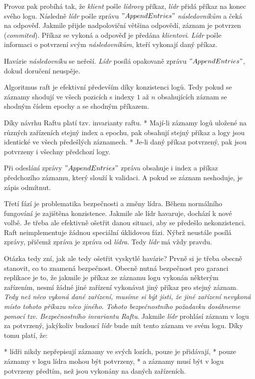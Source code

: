 Provoz pak probíhá tak, že {\em klient} pošle {\em lídrovy} příkaz, {\em lídr} přidá příkaz na konec svého logu. Následně {\em lídr} pošle zprávu $"AppendEntries"$ {\em následovníkům} a čeká na odpověď. Jakmile přijde nadpoloviční většina odpovědí, záznam je potvrzen ({\em commited}). Příkaz se vykoná a odpověď je předána {\em klientovi}. {\em Lídr} pošle informaci o potvrzení svým {\em následovníkům}, kteří vykonají daný příkaz.

Havárie {\em následovníku} se neřeší. {\em Lídr} posílá opakovaně zprávu $"AppendEntries"$, dokud doručení neuspěje.

Algoritmus raft je efektivní především díky konzistenci logů. Tedy pokud se záznamy shodují ve všech pozicích s indexy $1$ až $n$ obsahujících záznam se shodným číslem epochy a se shodným příkazem.

Díky návrhu Raftu platí tzv. {\sbf invarianty raftu}.
\begitems
* Mají-li záznamy logů uložené na různých zařízeních stejný index a epochu, pak obsahují stejný příkaz a logy jsou identické ve všech předešlých záznamech.
* Je-li daný příkaz potvrzený, pak jsou potvrzeny i všechny předchozí logy.
\enditems

Při odeslání zprávy $"AppendEntries"$ zpráva obsahuje i index a příkaz předchozího záznamu, který slouží k validaci. A pokud se záznam neshoduje, je zápis odmítnut.

{\sbf Třetí fází je problematika bezpečnosti a změny lídra}. Během normálního fungování je zajištěna konzistence. Jakmile ale lídr havaruje, dochází k nové volbě. Je třeba ale efektivně ošetřit danou situaci, aby se předešlo nekonzistenci. Raft neimplementuje žádnou speciální úklidovou fázi. Nýbrž neustále posílá zprávy, přičemž zpráva je zpráva od {\em lídra}. Tedy {\em lídr} má vždy pravdu.

Otázka tedy zní, jak ale tedy ošetřit vyskytlé havárie? Prvně si je třeba obecně stanovit, co to znamená {\sbf bezpečnost}. Obecně nutná bezpečnost pro garanci replikace je to, že jakmile je příkaz ze záznamu logu vykonán některým zařízením, nesmí žádné jiné zařízení vykonávat jiný příkaz pro stejný záznam. {\em Tedy než něco vykoná dané zařízení, musíme si být jisti, že jiné zařízení nevykoná místo tohoto příkazu něco jiného. Tohoto bezpečnostního požadavku dosáhneme pomocí tzv. {\sbf Bezpečnostního invariantu Raftu}}. Jakmile {\em lídr} prohlásí záznam v logu za potvrzený, jakýkoliv budoucí {\em lídr} bude mít tento záznam ve svém logu. Díky tomu platí, že:

\begitems
* lídři nikdy nepřepisují záznamy ve svých lozích, pouze je přidávají,
* pouze záznamy v logu lídra mohou být potvrzeny,
* a záznamy musí být v logu potvrzeny předtím, než jsou vykonány na daných zařízeních.
\enditems

